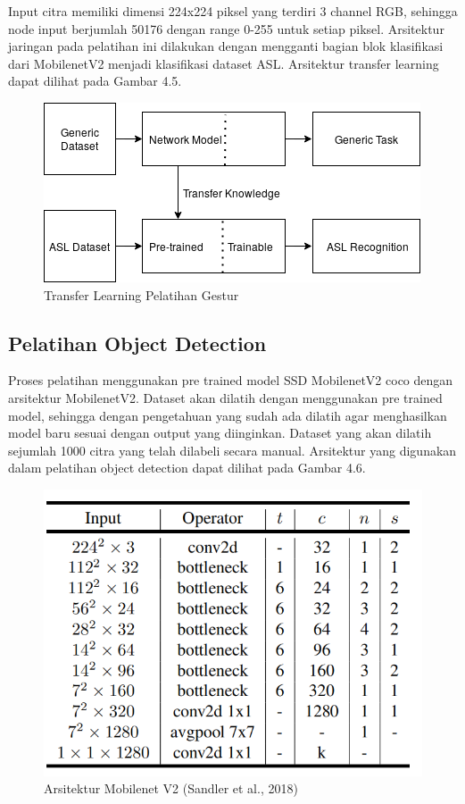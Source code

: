 Input citra memiliki dimensi 224x224 piksel yang terdiri 3 channel RGB, sehingga node input berjumlah 50176 dengan range 0-255 untuk setiap piksel. Arsitektur jaringan pada pelatihan ini dilakukan dengan mengganti bagian blok klasifikasi dari MobilenetV2 menjadi klasifikasi dataset ASL. 
Arsitektur transfer learning dapat dilihat pada Gambar 4.5.
\begin{figure}[H]
	\centering
	\includegraphics[width=0.8\linewidth]{transfer}
	\caption{Transfer Learning Pelatihan Gestur}
	\label{fig:asritrkturku}
\end{figure}

\subsection{Pelatihan Object Detection}
Proses pelatihan menggunakan pre trained model SSD MobilenetV2 coco dengan arsitektur MobilenetV2.
Dataset akan dilatih dengan menggunakan pre trained model, sehingga dengan pengetahuan yang sudah ada dilatih agar menghasilkan model baru sesuai dengan output yang diinginkan. 
Dataset yang akan dilatih sejumlah 1000 citra yang telah dilabeli secara manual.
Arsitektur yang digunakan dalam pelatihan object detection dapat dilihat pada Gambar 4.6.
\begin{figure}[H]
	\centering
	\includegraphics[width=0.7\linewidth]{"v2"}
	\caption{Arsitektur Mobilenet V2 (Sandler et al., 2018)}
	\label{fig:v2}
\end{figure}
